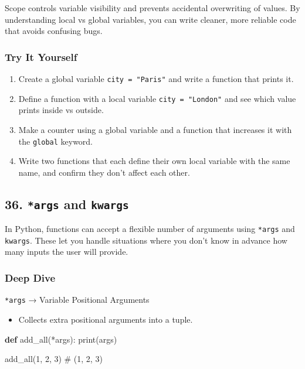 \documentclass[
  letterpaper,
  DIV=11,
  numbers=noendperiod]{scrreprt}
\newenvironment{Shaded}{\begin{snugshade}}{\end{snugshade}}
\newcommand{\BuiltInTok}[1]{\textcolor[rgb]{0.00,0.23,0.31}{#1}}
\newcommand{\CommentTok}[1]{\textcolor[rgb]{0.37,0.37,0.37}{#1}}
\newcommand{\DecValTok}[1]{\textcolor[rgb]{0.68,0.00,0.00}{#1}}
\newcommand{\KeywordTok}[1]{\textcolor[rgb]{0.00,0.23,0.31}{\textbf{#1}}}
\newcommand{\NormalTok}[1]{\textcolor[rgb]{0.00,0.23,0.31}{#1}}
\newcommand{\OperatorTok}[1]{\textcolor[rgb]{0.37,0.37,0.37}{#1}}
\providecommand{\tightlist}{%
  \setlength{\itemsep}{0pt}\setlength{\parskip}{0pt}}
\begin{document}
Scope controls variable visibility and prevents accidental overwriting
of values. By understanding local vs global variables, you can write
cleaner, more reliable code that avoids confusing bugs.

\subsubsection{Try It Yourself}\label{try-it-yourself-34}

\begin{enumerate}
\def\labelenumi{\arabic{enumi}.}
\tightlist
\item
  Create a global variable \texttt{city\ =\ "Paris"} and write a
  function that prints it.
\item
  Define a function with a local variable \texttt{city\ =\ "London"} and
  see which value prints inside vs outside.
\item
  Make a counter using a global variable and a function that increases
  it with the \texttt{global} keyword.
\item
  Write two functions that each define their own local variable with the
  same name, and confirm they don't affect each other.
\end{enumerate}

\subsection{\texorpdfstring{36. \texttt{*args} and
\texttt{kwargs}}{36. *args and kwargs}}\label{args-and-kwargs}

In Python, functions can accept a flexible number of arguments using
\texttt{*args} and \texttt{kwargs}. These let you handle situations
where you don't know in advance how many inputs the user will provide.

\subsubsection{Deep Dive}\label{deep-dive-35}

\texttt{*args} → Variable Positional Arguments

\begin{itemize}
\tightlist
\item
  Collects extra positional arguments into a tuple.
\end{itemize}

\begin{Shaded}
\begin{Highlighting}[]
\KeywordTok{def}\NormalTok{ add\_all(}\OperatorTok{*}\NormalTok{args):}
    \BuiltInTok{print}\NormalTok{(args)}

\NormalTok{add\_all(}\DecValTok{1}\NormalTok{, }\DecValTok{2}\NormalTok{, }\DecValTok{3}\NormalTok{)   }\CommentTok{\# (1, 2, 3)}
\end{Highlighting}
\end{Shaded}
\end{document}
